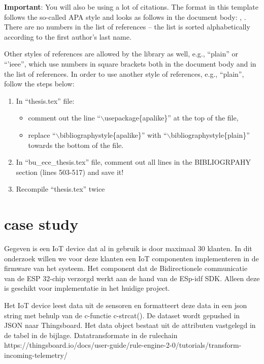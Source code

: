 {\bf Important}: You will also be using a lot of citations. The format in this template follows the so-called APA style and looks as follows in the document body: \cite{lamport1985:latex}, \cite{Debr01}. There are no numbers in the list of references -- the list is sorted alphabetically according to the first author's last name.

Other styles of references are allowed by the library as well, e.g., ``plain'' or ``'ieee'', which use numbers in square brackets both in the document body and in the list of references. In order to use another style of references, e.g., ``plain'', follow the steps below:
%
\begin{enumerate}
  \item In ``thesis.tex'' file:
	\begin{itemize}
	  \item comment out the line ``$\backslash$usepackage\{apalike\}'' at the top of the file,
	  \item replace ``$\backslash$bibliographystyle\{apalike\}'' with ``$\backslash$bibliographystyle\{plain\}'' towards the bottom of the file.
	\end{itemize}
  \item In ``bu\_ece\_thesis.tex'' file, comment out all lines in the BIBLIOGRPAHY section (lines 503-517) and save it!
  \item Recompile ``thesis.tex'' twice
\end{enumerate}

 

\section{case study}

Gegeven is een IoT device dat al in gebruik is door maximaal 30 klanten. In dit onderzoek willen we voor deze klanten een IoT componenten implementeren in de firmware van het systeem. Het component dat de Bidirectionele communicatie van de ESP 32-chip verzorgd werkt aan de hand van de ESp-idf SDK. Alleen deze is geschikt voor implementatie in het huidige project.   



Het IoT device leest data uit de sensoren en formatteert deze data in een json string met behulp van de c-functie c-strcat(). De dataset wordt gepushed in JSON naar Thingsboard. Het data object bestaat uit de attributen vastgelegd in de tabel in de bijlage.
Datatransformate in de rulechain
https://thingsboard.io/docs/user-guide/rule-engine-2-0/tutorials/transform-incoming-telemetry/ 


